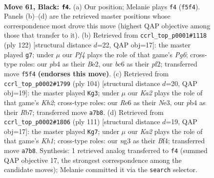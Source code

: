\documentclass[11pt]{article}
\begin{document}
\clearpage

\begin{figure}[p]\centering
\begin{subfigure}{0.46\textwidth}\centering
\resizebox{\linewidth}{!}{%
\newchessgame
\chessboard[
  setfen={8/k7/2B1r3/2R2p2/1P6/6N1/6P1/1K6 b - - 0 61},
  showmover=false,
  pgfstyle=straightmove, color=movearrow, markmove={f5-f4}
]}
\caption{}
\end{subfigure}\hfill
\begin{subfigure}{0.46\textwidth}\centering
\resizebox{\linewidth}{!}{%
\newchessgame
\chessboard[
  setfen={8/4k3/3r2P1/8/3b1K2/8/4Bp2/5R2 w - - 5 62},
  showmover=false,
  pgfstyle=straightmove, color=movearrow, markmove={g6-g7}
]}
\caption{}
\end{subfigure}
\\[4pt]
\begin{subfigure}{0.46\textwidth}\centering
\resizebox{\linewidth}{!}{%
\newchessgame
\chessboard[
  setfen={8/1R6/8/r4b1k/4p2P/4N3/7K/8 w - - 2 53},
  showmover=false,
  pgfstyle=straightmove, color=movearrow, markmove={h2-g3}
]}
\caption{}
\end{subfigure}\hfill
\begin{subfigure}{0.46\textwidth}\centering
\resizebox{\linewidth}{!}{%
\newchessgame
\chessboard[
  setfen={7k/8/5R1p/r4B2/4Pb2/8/2K5/8 b - - 0 56},
  showmover=false,
  pgfstyle=straightmove, color=movearrow, markmove={h8-g7}
]}
\caption{}
\end{subfigure}
\caption{\textbf{Move 61, Black: \texttt{f4}.} (a) Our position; Melanie plays \texttt{f4} (\texttt{f5f4}). Panels (b)--(d) are the retrieved master positions whose correspondence most drove this move (highest QAP objective among those that transfer to it). (b) Retrieved from \texttt{ccrl\_top\_p0001\#1118} (ply 122) [structural distance $d$=22, QAP obj=17]: the master played \texttt{g7}; under $\mu$ our \emph{Pf4} plays the role of that game's \emph{Pg6}; cross-type roles: our \emph{p}b4 as their \emph{B}e2, our \emph{b}c6 as their \emph{p}f2; transferred move \texttt{f5f4} \textbf{(endorses this move)}. (c) Retrieved from \texttt{ccrl\_top\_p0002\#1799} (ply 104) [structural distance $d$=20, QAP obj=19]: the master played \texttt{Kg3}; under $\mu$ our \emph{Ka2} plays the role of that game's \emph{Kh2}; cross-type roles: our \emph{R}e6 as their \emph{N}e3, our \emph{p}b4 as their \emph{R}b7; transferred move \texttt{a7b8}. (d) Retrieved from \texttt{ccrl\_top\_p0002\#1806} (ply 111) [structural distance $d$=19, QAP obj=17]: the master played \texttt{Kg7}; under $\mu$ our \emph{Ka2} plays the role of that game's \emph{Kh1}; cross-type roles: our \emph{n}g3 as their \emph{B}f4; transferred move \texttt{a7b8}. Synthesis: 1 retrieved analog transferred to \texttt{f4} (summed QAP objective 17, the strongest correspondence among the candidate moves); Melanie committed it via the \texttt{search} selector.}
\label{fig:thought-m121}
\end{figure}
\end{document}
